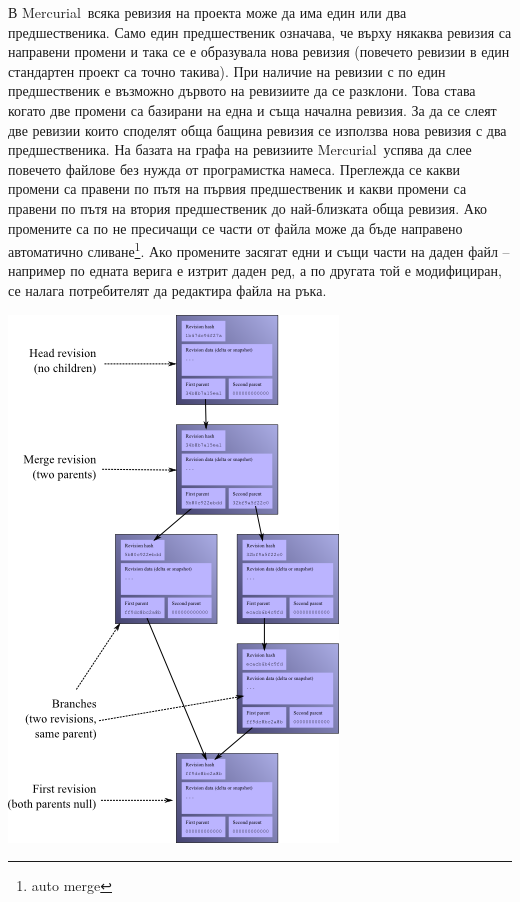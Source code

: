 \documentclass[a4paper]{article}
\def\Hg{Mercurial}
\begin{document}
    В \Hg\ всяка ревизия на проекта може да има един или два предшественика.
    Само един предшественик означава, че върху някаква ревизия са направени
    промени и така се е образувала нова ревизия (повечето ревизии в един
    стандартен проект са точно такива). При наличие на ревизии с по един
    предшественик е възможно дървото на ревизиите да се разклони. Това става когато две
    промени са базирани на една и съща начална ревизия. За да се слеят две
    ревизии които споделят обща бащина ревизия се използва нова ревизия с два
    предшественика. На базата на графа на ревизиите \Hg\ успява да слее повечето
    файлове без нужда от програмистка намеса. Преглежда се какви
    промени са правени по пътя на първия предшественик и какви промени са
    правени по пътя на втория предшественик до най-близката обща ревизия. Ако
    промените са по не пресичащи се части от файла може да бъде направено
    автоматично сливане\footnote{auto merge}. Ако промените засягат едни и същи части на даден
    файл -- например по едната верига е изтрит даден ред, а по другата
    той е модифициран, се налага потребителят да редактира файла на ръка.

    \begin{center}
      \includegraphics[scale=0.7]{hg_revisions}
    \end{center}
\end{document}
